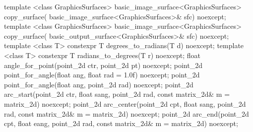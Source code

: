 \begin{codeblock}
{{    template <class GraphicsSurfaces>
    basic_image_surface<GraphicsSurfaces> copy_surface(
      basic_image_surface<GraphicsSurfaces>& sfc) noexcept;
    template <class GraphicsSurfaces>
    basic_image_surface<GraphicsSurfaces> copy_surface(
      basic_output_surface<GraphicsSurfaces>& sfc) noexcept;
    template <class T>
    constexpr T degrees_to_radians(T d) noexcept;
    template <class T>
    constexpr T radians_to_degrees(T r) noexcept;
    float angle_for_point(point_2d ctr, point_2d pt) noexcept;
    point_2d point_for_angle(float ang, float rad = 1.0f) noexcept;
    point_2d point_for_angle(float ang, point_2d rad) noexcept;
    point_2d arc_start(point_2d ctr, float sang, point_2d rad, 
      const matrix_2d& m = matrix_2d{}) noexcept;
    point_2d arc_center(point_2d cpt, float sang, point_2d rad, 
      const matrix_2d& m = matrix_2d{}) noexcept;
    point_2d arc_end(point_2d cpt, float eang, point_2d rad, 
      const matrix_2d& m = matrix_2d{}) noexcept;
} }

\end{codeblock}
%
